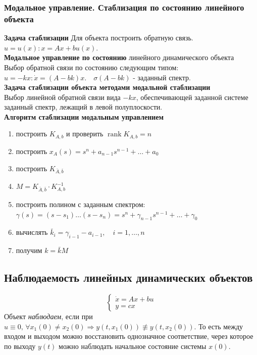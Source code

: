 \documentclass[A4]{article}
\begin{document}
\subsubsection{Модальное управление. Стаблизация по состоянию линейного объекта} 
\textbf{Задача стаблизации} Для объекта построить обратную связь.\\
$u=u(x):x=Ax+bu(x)$.\\
\textbf{Модальное управление по состоянию} линейного динамического объекта\\
Выбор обратной связи по состоянию следующим типом:\\
$u=-kx:\dot{x}=(A-bk)x.\quad \sigma(A-bk)$ - заданный спектр.\\
\textbf{Задача стаблизации объекта методами модальной стаблизации}\\
Выбор линейной обратной связи вида $-kx$, обеспечивающей заданной системе заданный спектр, лежащий в левой полуплоскости.\\
\textbf{Алгоритм стаблизации модальным управлением}
\begin{enumerate}
	\item построить $K_{A,b}$ и проверить $\operatorname{rank}K_{A,b}=n$
	\item построить $x_{A}(s)=s^n+a_{n-1}s^{n-1}+\ldots+a_0$
	\item построить $K_{\bar{A},\bar{b}}$
	\item $M=K_{\bar{A},\bar{b}}\cdot K_{A,b}^{-1}$
	\item построить полином с заданным спектром: $\gamma(s)=(s-s_1)\ldots(s-s_n)=s^n+\gamma_{n-1}s^{n-1}+\ldots+\gamma_0$
	\item вычислять $\bar{k}_i=\gamma_{i-1}-a_{i-1},\quad i=1,\ldots,n$
	\item получим $k=\bar{k}M$ 
\end{enumerate}
\subsection{Наблюдаемость линейных динамических объектов} 
\begin{equation}
\left\{\begin{array}{cc}
\dot{x}=Ax+bu\\
y=cx
\end{array}\right.
\end{equation}
Объект \emph{наблюдаем}, если при $u\equiv0,\,\forall x_1(0)\ne x_2(0)\Rightarrow y(t,x_1(0))\not\equiv y(t,x_2(0))$. То есть между входом и выходом можно восстановить однозначное соответствие, через которое по выходу $y(t)$ можно наблюдать начальное состояние системы $x(0)$.
\end{document}
